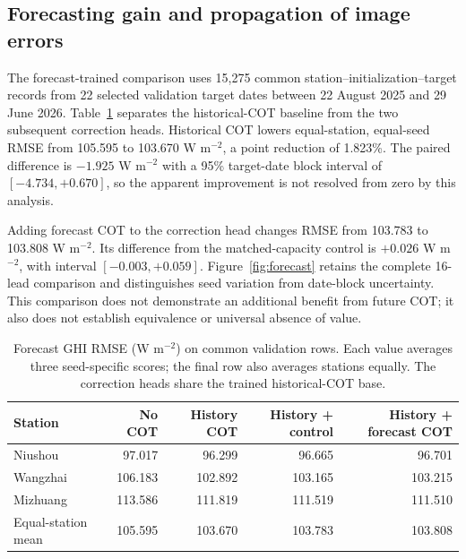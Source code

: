 \documentclass[11pt]{article}
\begin{document}
\subsection{Forecasting gain and propagation of image errors}
The forecast-trained comparison uses 15,275 common station--initialization--target records from 22 selected validation target dates between 22 August 2025 and 29 June 2026. Table~\ref{tab:forecast_values} separates the historical-COT baseline from the two subsequent correction heads. Historical COT lowers equal-station, equal-seed RMSE from 105.595 to 103.670 W m$^{-2}$, a point reduction of 1.823\%. The paired difference is $-1.925$ W m$^{-2}$ with a 95\% target-date block interval of $[-4.734,+0.670]$, so the apparent improvement is not resolved from zero by this analysis.

Adding forecast COT to the correction head changes RMSE from 103.783 to 103.808 W m$^{-2}$. Its difference from the matched-capacity control is $+0.026$ W m$^{-2}$, with interval $[-0.003,+0.059]$. Figure~\ref{fig:forecast} retains the complete 16-lead comparison and distinguishes seed variation from date-block uncertainty. This comparison does not demonstrate an additional benefit from future COT; it also does not establish equivalence or universal absence of value.

\begin{table}[!htbp]\centering\small
\caption{Forecast GHI RMSE (W m$^{-2}$) on common validation rows. Each value averages three seed-specific scores; the final row also averages stations equally. The correction heads share the trained historical-COT base.}\label{tab:forecast_values}
\begin{tabularx}{\linewidth}{Xrrrr}\toprule
Station & No COT & History COT & History + control & History + forecast COT\\\midrule
Niushou & 97.017 & 96.299 & 96.665 & 96.701\\
Wangzhai & 106.183 & 102.892 & 103.165 & 103.215\\
Mizhuang & 113.586 & 111.819 & 111.519 & 111.510\\
Equal-station mean & 105.595 & 103.670 & 103.783 & 103.808\\\bottomrule
\end{tabularx}\end{table}
\end{document}
